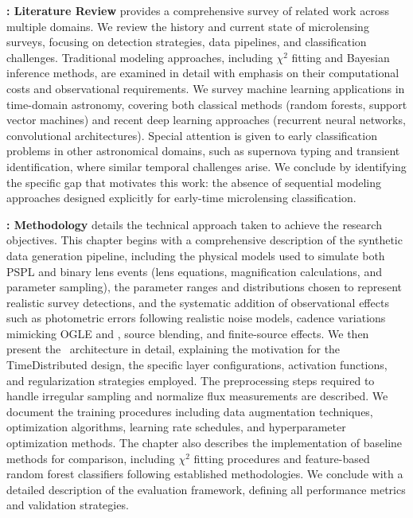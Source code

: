 \textbf{: Literature Review} provides a comprehensive survey of related work across multiple domains. We review the history and current state of microlensing surveys, focusing on detection strategies, data pipelines, and classification challenges. Traditional modeling approaches, including $\chi^2$ fitting and Bayesian inference methods, are examined in detail with emphasis on their computational costs and observational requirements. We survey machine learning applications in time-domain astronomy, covering both classical methods (random forests, support vector machines) and recent deep learning approaches (recurrent neural networks, convolutional architectures). Special attention is given to early classification problems in other astronomical domains, such as supernova typing and transient identification, where similar temporal challenges arise. We conclude by identifying the specific gap that motivates this work: the absence of sequential modeling approaches designed explicitly for early-time microlensing classification.

\textbf{: Methodology} details the technical approach taken to achieve the research objectives. This chapter begins with a comprehensive description of the synthetic data generation pipeline, including the physical models used to simulate both PSPL and binary lens events (lens equations, magnification calculations, and parameter sampling), the parameter ranges and distributions chosen to represent realistic survey detections, and the systematic addition of observational effects such as photometric errors following realistic noise models, cadence variations mimicking OGLE and \lsst, source blending, and finite-source effects. We then present the \cnn\ architecture in detail, explaining the motivation for the TimeDistributed design, the specific layer configurations, activation functions, and regularization strategies employed. The preprocessing steps required to handle irregular sampling and normalize flux measurements are described. We document the training procedures including data augmentation techniques, optimization algorithms, learning rate schedules, and hyperparameter optimization methods. The chapter also describes the implementation of baseline methods for comparison, including $\chi^2$ fitting procedures and feature-based random forest classifiers following established methodologies. We conclude with a detailed description of the evaluation framework, defining all performance metrics and validation strategies.

